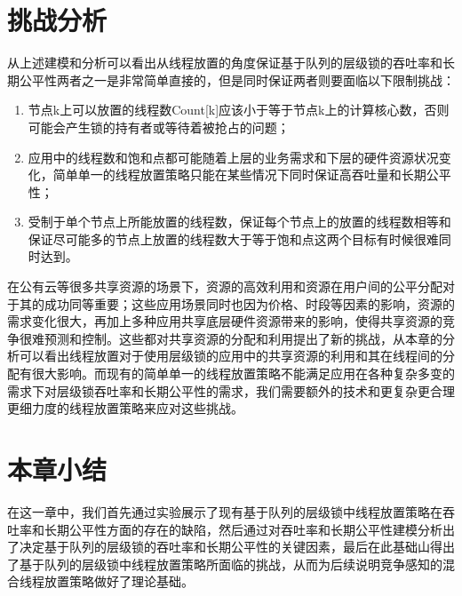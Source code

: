 \section{挑战分析}
从上述建模和分析可以看出从线程放置的角度保证基于队列的层级锁的吞吐率和长期公平性两者之一是非常简单直接的，但是同时保证两者则要面临以下限制挑战：
\begin{enumerate}
  \item 节点k上可以放置的线程数Count[k]应该小于等于节点k上的计算核心数，否则可能会产生锁的持有者或等待着被抢占的问题；
  \item 应用中的线程数和饱和点都可能随着上层的业务需求和下层的硬件资源状况变化，简单单一的线程放置策略只能在某些情况下同时保证高吞吐量和长期公平性；
  \item 受制于单个节点上所能放置的线程数，保证每个节点上的放置的线程数相等和保证尽可能多的节点上放置的线程数大于等于饱和点这两个目标有时候很难同时达到。
\end{enumerate}

在公有云等很多共享资源的场景下，资源的高效利用和资源在用户间的公平分配对于其的成功同等重要；这些应用场景同时也因为价格、时段等因素的影响，资源的需求变化很大，再加上多种应用共享底层硬件资源带来的影响，使得共享资源的竞争很难预测和控制。这些都对共享资源的分配和利用提出了新的挑战，从本章的分析可以看出线程放置对于使用层级锁的应用中的共享资源的利用和其在线程间的分配有很大影响。而现有的简单单一的线程放置策略不能满足应用在各种复杂多变的需求下对层级锁吞吐率和长期公平性的需求，我们需要额外的技术和更复杂更合理更细力度的线程放置策略来应对这些挑战。

\section{本章小结}
在这一章中，我们首先通过实验展示了现有基于队列的层级锁中线程放置策略在吞吐率和长期公平性方面的存在的缺陷，然后通过对吞吐率和长期公平性建模分析出了决定基于队列的层级锁的吞吐率和长期公平性的关键因素，最后在此基础山得出了基于队列的层级锁中线程放置策略所面临的挑战，从而为后续说明竞争感知的混合线程放置策略做好了理论基础。
